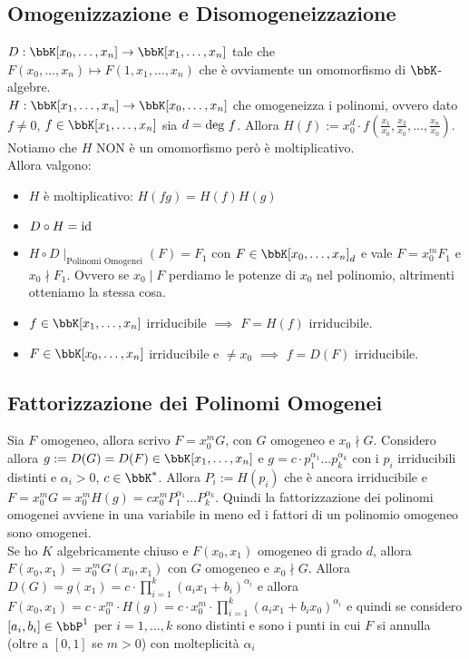 \documentclass[a4paper,NoNotes,GeneralMath]{stdmdoc}
\begin{document}
	\subsection*{Omogenizzazione e Disomogeneizzazione}
	$D: \bbK[x_0, \ldots, x_n] \rar \bbK[x_1, \ldots, x_n]$ tale che $F(x_0, \ldots, x_n) \mapsto F(1, x_1, \ldots, x_n)$ che è ovviamente un omomorfismo di $\bbK$-algebre. \\
	$H: \bbK[x_1, \ldots, x_n] \rar \bbK[x_0, \ldots, x_n]$ che omogeneizza i polinomi, ovvero dato $f \neq 0$, $f \in \bbK[x_1, \ldots, x_n]$ sia $d = \mbox{deg } f$. Allora $H(f) := x_0^d \cdot f(\frac{x_1}{x_0}, \frac{x_2}{x_0}, \ldots, \frac{x_n}{x_0})$. Notiamo che $H$ NON è un omomorfismo però è moltiplicativo. \\
	Allora valgono:
	\begin{itemize}
		\item $H$ è moltiplicativo: $H(fg) = H(f) H(g)$
		\item $D \circ H = \mbox{id}$
		\item $H \circ D \mid_{\text{Polinomi Omogenei}} (F) = F_1$ con $F \in \bbK[x_0, \ldots, x_n]_d$ e vale $F = x_0^m F_1$ e $x_0 \nmid F_1$. Ovvero se $x_0 \mid F$ perdiamo le potenze di $x_0$ nel polinomio, altrimenti otteniamo la stessa cosa.
		\item $f \in \bbK[x_1, \ldots, x_n]$ irriducibile $\implies$ $F=H(f)$ irriducibile.
		\item $F \in \bbK[x_0, \ldots, x_n]$ irriducibile e $\neq x_0$ $\implies$ $f=D(F)$ irriducibile.
	\end{itemize}

	\subsection*{Fattorizzazione dei Polinomi Omogenei}
	Sia $F$ omogeneo, allora scrivo $F = x_0^m G$, con $G$ omogeneo e $x_0 \nmid G$. Considero allora $g := D(G) = D(F) \in \bbK[x_1, \ldots, x_n]$ e $g = c \cdot p_1^{\alpha_1} \ldots p_k^{\alpha_k}$ con i $p_i$ irriducibili distinti e $\alpha_i > 0$, $c \in \bbK^{*}$. Allora $P_i := H(p_i)$ che è ancora irriducibile e $F = x_0^m G = x_0^m H(g) = c x_0^m P_1^{\alpha_1} \ldots P_k^{\alpha_k}$. Quindi la fattorizzazione dei polinomi omogenei avviene in una variabile in meno ed i fattori di un polinomio omogeneo sono omogenei. \\
	Se ho $K$ algebricamente chiuso e $F(x_0, x_1)$ omogeneo di grado $d$, allora $F(x_0, x_1) = x_0^m G(x_0, x_1)$ con $G$ omogeneo e $x_0 \nmid G$. Allora $D(G) = g(x_1) = c \cdot \prod_{i=1}^{k} (a_i x_1 + b_i)^{\alpha_i}$ e allora $F(x_0, x_1) = c \cdot x_0^m \cdot H(g) = c \cdot x_0^m \cdot \prod_{i=1}^{k} (a_ix_1+b_ix_0)^{\alpha_i}$ e quindi se considero $[a_i, b_i] \in \bbP^1$ per $i=1, \ldots, k$ sono distinti e sono i punti in cui $F$ si annulla (oltre a $[0, 1]$ se $m > 0$) con molteplicità $\alpha_i$
	
\end{document}
